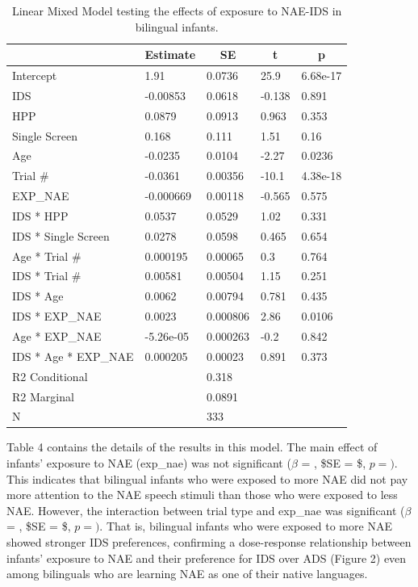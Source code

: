 \documentclass[,man,floatsintext]{apa6}
\begin{document}
\begin{table}[tbp]
\begin{center}
\begin{threeparttable}
\caption{\label{tab:unnamed-chunk-12}Linear Mixed Model testing the effects of exposure to NAE-IDS in bilingual infants.}
\begin{tabular}{lllll}
\toprule
 & \multicolumn{1}{c}{Estimate} & \multicolumn{1}{c}{SE} & \multicolumn{1}{c}{t} & \multicolumn{1}{c}{p}\\
\midrule
Intercept & 1.91 & 0.0736 & 25.9 & 6.68e-17\\
IDS & -0.00853 & 0.0618 & -0.138 & 0.891\\
HPP & 0.0879 & 0.0913 & 0.963 & 0.353\\
Single Screen & 0.168 & 0.111 & 1.51 & 0.16\\
Age & -0.0235 & 0.0104 & -2.27 & 0.0236\\
Trial \# & -0.0361 & 0.00356 & -10.1 & 4.38e-18\\
EXP\_NAE & -0.000669 & 0.00118 & -0.565 & 0.575\\
IDS * HPP & 0.0537 & 0.0529 & 1.02 & 0.331\\
IDS * Single Screen & 0.0278 & 0.0598 & 0.465 & 0.654\\
Age * Trial \# & 0.000195 & 0.00065 & 0.3 & 0.764\\
IDS * Trial \# & 0.00581 & 0.00504 & 1.15 & 0.251\\
IDS * Age & 0.0062 & 0.00794 & 0.781 & 0.435\\
IDS * EXP\_NAE & 0.0023 & 0.000806 & 2.86 & 0.0106\\
Age * EXP\_NAE & -5.26e-05 & 0.000263 & -0.2 & 0.842\\
IDS * Age * EXP\_NAE & 0.000205 & 0.00023 & 0.891 & 0.373\\ \midrule
R2 Conditional &  & 0.318 &  & \\
R2 Marginal &  & 0.0891 &  & \\ \midrule
N &  & 333 &  & \\
\bottomrule
\end{tabular}
\end{threeparttable}
\end{center}
\end{table}

Table 4 contains the details of the results in this model. The main effect of infants' exposure to NAE (exp\_nae) was not significant (\(\beta\) = , \$SE = \$, \(p = )\). This indicates that bilingual infants who were exposed to more NAE did not pay more attention to the NAE speech stimuli than those who were exposed to less NAE. However, the interaction between trial type and exp\_nae was significant (\(\beta\) = , \$SE = \$, \(p = )\). That is, bilingual infants who were exposed to more NAE showed stronger IDS preferences, confirming a dose-response relationship between infants' exposure to NAE and their preference for IDS over ADS (Figure 2) even among bilinguals who are learning NAE as one of their native languages.
\end{document}
